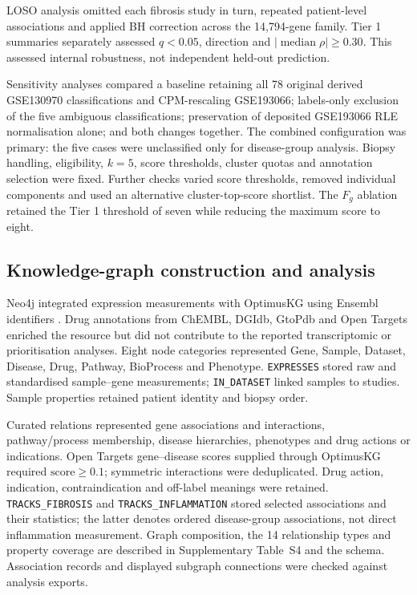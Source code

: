 \documentclass[11pt,a4paper]{article}
\begin{document}
LOSO analysis omitted each fibrosis study in turn, repeated patient-level associations and applied BH correction across the 14,794-gene family. Tier 1 summaries separately assessed $q<0.05$, direction and $|\operatorname{median}\rho|\geq0.30$. This assessed internal robustness, not independent held-out prediction.

Sensitivity analyses compared a baseline retaining all 78 original derived GSE130970 classifications and CPM-rescaling GSE193066; labels-only exclusion of the five ambiguous classifications; preservation of deposited GSE193066 RLE normalisation alone; and both changes together. The combined configuration was primary: the five cases were unclassified only for disease-group analysis. Biopsy handling, eligibility, $k=5$, score thresholds, cluster quotas and annotation selection were fixed. Further checks varied score thresholds, removed individual components and used an alternative cluster-top-score shortlist. The $F_g$ ablation retained the Tier 1 threshold of seven while reducing the maximum score to eight.

\subsection*{Knowledge-graph construction and analysis}
Neo4j integrated expression measurements with OptimusKG using Ensembl identifiers \cite{ref5}. Drug annotations from ChEMBL, DGIdb, GtoPdb and Open Targets enriched the resource but did not contribute to the reported transcriptomic or prioritisation analyses. Eight node categories represented Gene, Sample, Dataset, Disease, Drug, Pathway, BioProcess and Phenotype. \texttt{EXPRESSES} stored raw and standardised sample--gene measurements; \texttt{IN\_DATASET} linked samples to studies. Sample properties retained patient identity and biopsy order.

Curated relations represented gene associations and interactions, pathway/process membership, disease hierarchies, phenotypes and drug actions or indications. Open Targets gene--disease scores supplied through OptimusKG required $\mathrm{score}\geq0.1$; symmetric interactions were deduplicated. Drug action, indication, contraindication and off-label meanings were retained. \texttt{TRACKS\_FIBROSIS} and \texttt{TRACKS\_INFLAMMATION} stored selected associations and their statistics; the latter denotes ordered disease-group associations, not direct inflammation measurement. Graph composition, the 14 relationship types and property coverage are described in Supplementary Table~S4 and the schema. Association records and displayed subgraph connections were checked against analysis exports.
\end{document}
